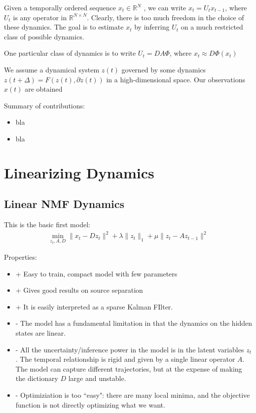 \documentclass[11pt]{article} %
\begin{document}
Given a temporally ordered sequence $x_t \in \mathbb{R}^N$ , we can 
write $x_t = U_{t} x_{t-1}$, where $U_t$ is any operator in $\mathbb{R}^{N \times N}$.
Clearly, there is too much freedom in the choice of these dynamics. The 
goal is to estimate $x_t$ by inferring $U_t$ on a much restricted class of possible dynamics.

One particular class of dynamics is to write $U_t = D A \Phi$, where 
$x_t \approx D \Phi(x_t)$

We assume a dynamical system $z(t)$ governed by some dynamics 
$z(t+\Delta) = F( z(t), \partial z(t))$ in a high-dimensional space. 
Our observations $x(t)$ are obtained 


Summary of contributions:
\begin{itemize}
\item bla 
\item bla
\end{itemize}


\section{Linearizing Dynamics}

\subsection{Linear NMF Dynamics}

This is the basic first model:
\begin{eqnarray}
\min_{z_t, A, D} \| x_t - D z_t \|^2 + \lambda \|z_t \|_1 + \mu \|z_t - A z_{t-1} \|^2
\end{eqnarray}

Properties:
\begin{itemize}
\item + Easy to train, compact model with few parameters
\item + Gives good results on source separation
\item + It is easily interpreted as a sparse Kalman FIlter.
\item - The model has a fundamental limitation in that the dynamics on the hidden states are linear. 
\item - All the uncertainty/inference power in the model is in the latent variables $z_t$. The temporal relationship is rigid and given by
a single linear operator $A$. The model can capture different trajectories, but at the expense of making the dictionary $D$ large and unstable.
\item - Optimiziation is too ``easy": there are many local minima, and the objective function is not directly optimizing what we want.
\end{itemize}
\end{document}
